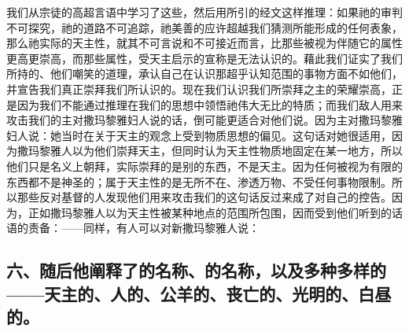 我们从宗徒的高超言语中学习了这些，然后用所引的经文这样推理：如果祂的审判不可探究，祂的道路不可追踪，祂美善的应许超越我们猜测所能形成的任何表象，那么祂实际的天主性，就其不可言说和不可接近而言，比那些被视为伴随它的属性更高更崇高，而那些属性，受天主启示的宣称是无法认识的。藉此我们证实了我们所持的、他们嘲笑的道理，承认自己在认识那超乎认知范围的事物方面不如他们，并宣告我们真正崇拜我们所认识的。现在我们认识我们所崇拜之主的荣耀崇高，正是因为我们不能通过推理在我们的思想中领悟祂伟大无比的特质；而我们敌人用来攻击我们的主对撒玛黎雅妇人说的话，倒可能更适合对他们说。因为主对撒玛黎雅妇人说：她当时在关于天主的观念上受到物质思想的偏见。这句话对她很适用，因为撒玛黎雅人以为他们崇拜天主，但同时认为天主性物质地固定在某一地方，所以他们只是名义上朝拜，实际崇拜的是别的东西，不是天主。因为任何被视为有限的东西都不是神圣的；属于天主性的是无所不在、渗透万物、不受任何事物限制。所以那些反对基督的人发现他们用来攻击我们的这句话反过来成了对自己的控告。因为，正如撒玛黎雅人以为天主性被某种地点的范围所包围，因而受到他们听到的话语的责备：——同样，有人可以对新撒玛黎雅人说：\par


\subsection{六、随后他阐释了的名称、的名称，以及多种多样的——天主的、人的、公羊的、丧亡的、光明的、白昼的。}

